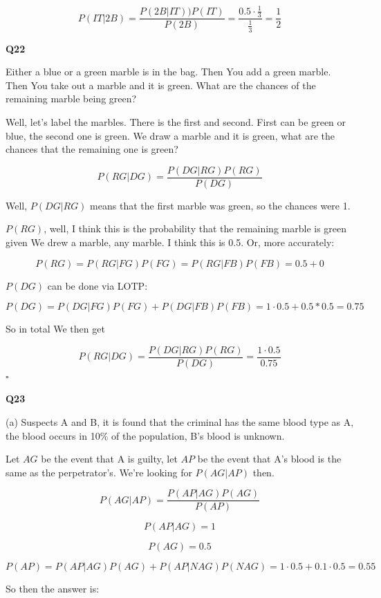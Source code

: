 \documentclass{article}
\newcommand{\qed}{\hfill$\square$}
\begin{document}
			$$P(IT\vert 2B) = \frac{P(2B\vert IT))P(IT)}{P(2B)} = \frac{0.5\cdot \frac{1}{3}}{\frac{1}{3}} = \frac{1}{2}$$
			
		\textbf{Q22}
		
			Either a blue or a green marble is in the bag. Then You add a green marble. Then You take out a marble and it is green. What are the chances of the remaining marble being green?
			
			Well, let's label the marbles. There is the first and second. First can be green or blue, the second one is green. We draw a marble and it is green, what are the chances that the remaining one is green?
			
			$$P(RG\vert DG) = \frac{P(DG\vert RG)P(RG)}{P(DG)}$$ 
			
			Well, $P(DG\vert RG)$ means that the first marble was green, so the chances were 1.
			
			$P(RG)$, well, I think this is the probability that the remaining marble is green given We drew a marble, any marble. I think this is 0.5. Or, more accurately:
			
			$$P(RG) = P(RG\vert FG)P(FG) = P(RG\vert FB)P(FB) = 0.5 + 0$$
			
			$P(DG)$ can be done via LOTP:
			
			$$P(DG) = P(DG\vert FG)P(FG) + P(DG\vert FB)P(FB) = 1\cdot 0.5 + 0.5*0.5 = 0.75$$
			
			So in total We then get 
			
			$$P(RG\vert DG) = \frac{P(DG\vert RG)P(RG)}{P(DG)} = \frac{1\cdot 0.5}{0.75}$$ \qed
			
			\hfill
			
			\textbf{Q23}
			
				(a) Suspects A and B, it is found that the criminal has the same blood type as A, the blood occurs in 10\% of the population, B's blood is unknown. 
				
				Let $AG$ be the event that A is guilty, let $AP$ be the event that A's blood is the same as the perpetrator's. We're looking for $P(AG\vert AP)$ then.
				
				$$P(AG\vert AP) = \frac{P(AP\vert AG)P(AG)}{P(AP)}$$
				
				$$P(AP\vert AG) = 1$$
				
				$$P(AG) = 0.5$$
				
				$$P(AP) = P(AP\vert AG)P(AG) + P(AP\vert NAG)P(NAG) = 1\cdot 0.5 + 0.1\cdot 0.5 = 0.55$$
				
				So then the answer is: 
				
\end{document}
